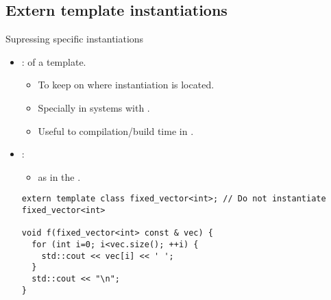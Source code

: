 \subsection{Extern template instantiations}

\begin{frame}[t,fragile]{Supressing specific instantiations}
\begin{itemize}
  \item {}:  of a template.
    \begin{itemize}
      \item To keep  on where instantiation is located.
      \item Specially  in systems with .
      \item Useful to  compilation/build time 
            in .
    \end{itemize}

  \item {}:
    \begin{itemize}
      \item {} as 
            in the .
    \end{itemize}

\begin{lstlisting}
extern template class fixed_vector<int>; // Do not instantiate fixed_vector<int>

void f(fixed_vector<int> const & vec) {
  for (int i=0; i<vec.size(); ++i) {
    std::cout << vec[i] << ' ';
  }
  std::cout << "\n";
}
\end{lstlisting}

\end{itemize}
\end{frame}


